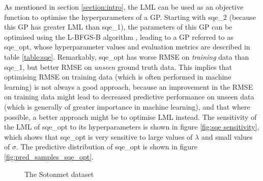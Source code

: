 \documentclass{article}
\begin{document}
As mentioned in section \ref{section:intro}, the LML can be used as an objective function to optimise the hyperparameters of a GP. Starting with sqe\_2 (because this GP has greater LML than sqe\_1), the parameters of this GP can be optimised using the L-BFGS-B algorithm \cite{wright1999numerical}, leading to a GP referred to as sqe\_opt, whose hyperparameter values and evaluation metrics are described in table \ref{table:sqe}. Remarkably, sqe\_opt has worse RMSE on \emph{training} data than sqe\_1, but better RMSE on \emph{unseen} ground truth data. This implies that optimising RMSE on training data (which is often performed in machine learning) is not always a good approach, because an improvement in the RMSE on training data might lead to decreased predictive performance on unseen data (which is generally of greater importance in machine learning), and that where possible, a better approach might be to optimise LML instead. The sensitivity of the LML of sqe\_opt to its hyperparameters is shown in figure \ref{fig:sqe sensitivity}, which shows that sqe\_opt is very sensitive to large values of $\lambda$ and small values of $\sigma$. The predictive distribution of sqe\_opt is shown in figure \ref{fig:pred_samples_sqe_opt}.
\begin{figure}[pht]
    \centering
    \caption{The Sotonmet dataset}
    \label{fig:sotonmet}
\end{figure}
\end{document}
